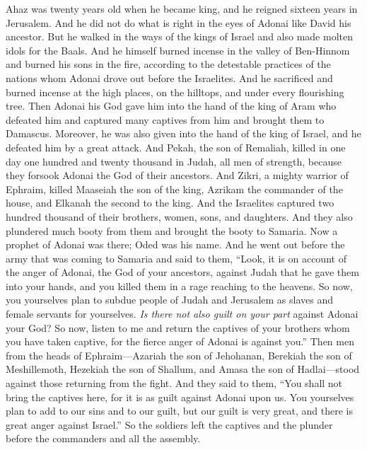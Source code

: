 \begin{biblechapter} %
 Ahaz was twenty years old when he became king, and he reigned sixteen years in Jerusalem. And he did not do what is right in the eyes of Adonai like David his ancestor.
\verse But he walked in the ways of the kings of Israel and also made molten idols for the Baals.
\verse And he himself burned incense in the valley of Ben-Hinnom and burned his sons in the fire, according to the detestable practices of the nations whom Adonai drove out before the Israelites.
\verse And he sacrificed and burned incense at the high places, on the hilltops, and under every flourishing tree.
\verse Then Adonai his God gave him into the hand of the king of Aram who defeated him and captured many captives from him and brought them to Damascus. Moreover, he was also given into the hand of the king of Israel, and he defeated him by a great attack.
\verse And Pekah, the son of Remaliah, killed in one day one hundred and twenty thousand in Judah, all men of strength, because they forsook Adonai the God of their ancestors.
\verse And Zikri, a mighty warrior of Ephraim, killed Maaseiah the son of the king, Azrikam the commander of the house, and Elkanah the second to the king.
\verse And the Israelites captured two hundred thousand of their brothers, women, sons, and daughters. And they also plundered much booty from them and brought the booty to Samaria.
\verse Now a prophet of Adonai was there; Oded was his name. And he went out before the army that was coming to Samaria and said to them, “Look, it is on account of the anger of Adonai, the God of your ancestors, against Judah that he gave them into your hands, and you killed them in a rage reaching to the heavens.
\verse So now, you yourselves plan to subdue people of Judah and Jerusalem as slaves and female servants for yourselves. \textit{Is there not also guilt on your part} against Adonai your God?
\verse So now, listen to me and return the captives of your brothers whom you have taken captive, for the fierce anger of Adonai is against you.”
\verse Then men from the heads of Ephraim—Azariah the son of Jehohanan, Berekiah the son of Meshillemoth, Hezekiah the son of Shallum, and Amasa the son of Hadlai—stood against those returning from the fight.
\verse And they said to them, “You shall not bring the captives here, for it is as guilt against Adonai upon us. You yourselves plan to add to our sins and to our guilt, but our guilt is very great, and there is great anger against Israel.”
\verse So the soldiers left the captives and the plunder before the commanders and all the assembly.

\end{biblechapter}
